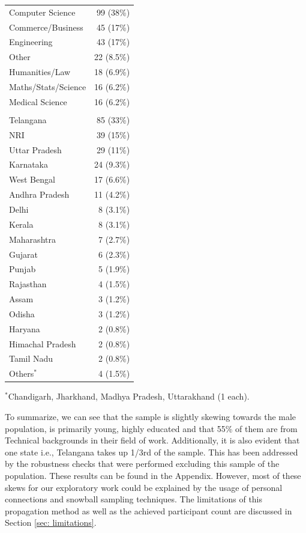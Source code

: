 \begin{table}[htbp]
\begin{minipage}[t]{0.48\textwidth}
\begin{tabular*}{\linewidth}{@{\extracolsep{\fill}}lr@{}}
\quad Computer Science & 99 (38\%) \\       
\quad Commerce/Business & 45 (17\%) \\
\quad Engineering & 43 (17\%) \\
\quad Other & 22 (8.5\%) \\
\quad Humanities/Law & 18 (6.9\%) \\
\quad Maths/Stats/Science & 16 (6.2\%) \\
\quad Medical Science & 16 (6.2\%) \\
\addlinespace
\multicolumn{2}{l}{\textit{Residence}} \\
\quad Telangana & 85 (33\%) \\
\quad NRI & 39 (15\%) \\
\quad Uttar Pradesh & 29 (11\%) \\
\quad Karnataka & 24 (9.3\%) \\
\quad West Bengal & 17 (6.6\%) \\
\quad Andhra Pradesh & 11 (4.2\%) \\
\quad Delhi & 8 (3.1\%) \\
\quad Kerala & 8 (3.1\%) \\
\quad Maharashtra & 7 (2.7\%) \\
\quad Gujarat & 6 (2.3\%) \\
\quad Punjab & 5 (1.9\%) \\
\quad Rajasthan & 4 (1.5\%) \\
\quad Assam & 3 (1.2\%) \\
\quad Odisha & 3 (1.2\%) \\
\quad Haryana & 2 (0.8\%) \\
\quad Himachal Pradesh & 2 (0.8\%) \\
\quad Tamil Nadu & 2 (0.8\%) \\
\quad Others$^{*}$ & 4 (1.5\%) \\
\bottomrule
\end{tabular*}
\end{minipage}
\vspace{2pt}
\footnotesize $^{*}$Chandigarh, Jharkhand, Madhya Pradesh, Uttarakhand (1 each).
\end{table}


To summarize, we can see that the sample is slightly skewing towards the male population, is primarily young, highly educated and that 55\% of them are from Technical backgrounds in their field of work. Additionally, it is also evident that one state i.e., Telangana takes up 1/3rd of the sample. This has been addressed by the robustness checks that were performed excluding this sample of the population. These results can be found in the Appendix. However, most of these skews for our exploratory work could be explained by the usage of personal connections and snowball sampling techniques. The limitations of this propagation method as well as the achieved participant count are discussed in Section \ref{sec: limitations}. 
